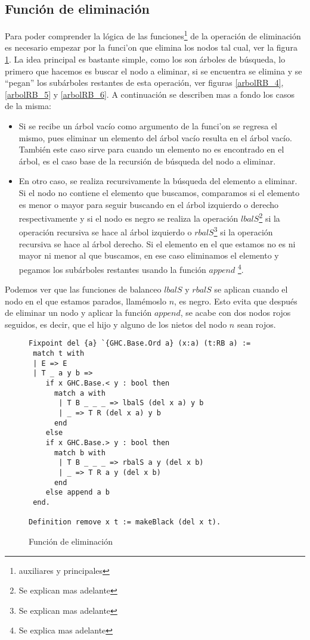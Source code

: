 \subsection{Funci\'on de eliminaci\'on}

Para poder comprender la l\'ogica de las funciones\footnote{auxiliares y principales} de la
operaci\'on de eliminaci\'on es necesario empezar por la funci'on que elimina los nodos tal cual,
ver la figura \ref{func_del}. La idea principal es bastante simple, como los {\arns} son \'arboles
de búsqueda, lo primero que hacemos es buscar el nodo a eliminar, si se encuentra se elimina y se
``pegan'' los subárboles restantes de esta operaci\'on, ver figuras \ref{arbolRB_4},
\ref{arbolRB_5} y \ref{arbolRB_6}. A continuaci\'on se describen mas a fondo los casos de la misma:

\begin{itemize}
    \item Si se recibe un \'arbol vacío como argumento de la funci'on se regresa el mismo, pues
    eliminar un elemento del \'arbol vacío resulta en el \'arbol vacío. También este caso sirve para
    cuando un elemento no es encontrado en el \'arbol, es el caso base de la recursi\'on de
    búsqueda del nodo a eliminar.
    \item En otro caso, se realiza recursivamente la búsqueda del elemento a eliminar. Si el nodo
    no contiene el elemento que buscamos, comparamos si el elemento es menor o mayor para seguir
    buscando en el \'arbol izquierdo o derecho respectivamente y si el nodo es negro se realiza la
    operaci\'on $lbalS$\footnote{Se explican mas adelante} si la operación recursiva se hace al
    árbol izquierdo o $rbalS$\footnote{Se explican mas adelante} si la operación recursiva se hace
    al árbol derecho. Si el elemento en el que estamos no es ni mayor ni menor al que buscamos, en
    ese caso eliminamos el elemento y pegamos los subárboles restantes usando la función $append$
    \footnote{Se explica mas adelante}.
\end{itemize}

Podemos ver que las funciones de balanceo $lbalS$ y $rbalS$ se aplican cuando el nodo en el que
estamos parados, llamémoslo $n$, es negro. Esto evita que después de eliminar un nodo y aplicar la
funci\'on $append$, se acabe con dos nodos rojos seguidos, es decir, que el hijo y alguno de los
nietos del nodo $n$ sean rojos.

\begin{figure}
\centering
\captionsetup{justification=centering}
\begin{verbatim}
Fixpoint del {a} `{GHC.Base.Ord a} (x:a) (t:RB a) :=
 match t with
 | E => E
 | T _ a y b =>
    if x GHC.Base.< y : bool then
      match a with
       | T B _ _ _ => lbalS (del x a) y b
       | _ => T R (del x a) y b
      end
    else
    if x GHC.Base.> y : bool then
      match b with
       | T B _ _ _ => rbalS a y (del x b)
       | _ => T R a y (del x b)
      end
    else append a b
 end.

Definition remove x t := makeBlack (del x t).
\end{verbatim}
\caption{Función de eliminación}
\label{func_del}
\end{figure}

